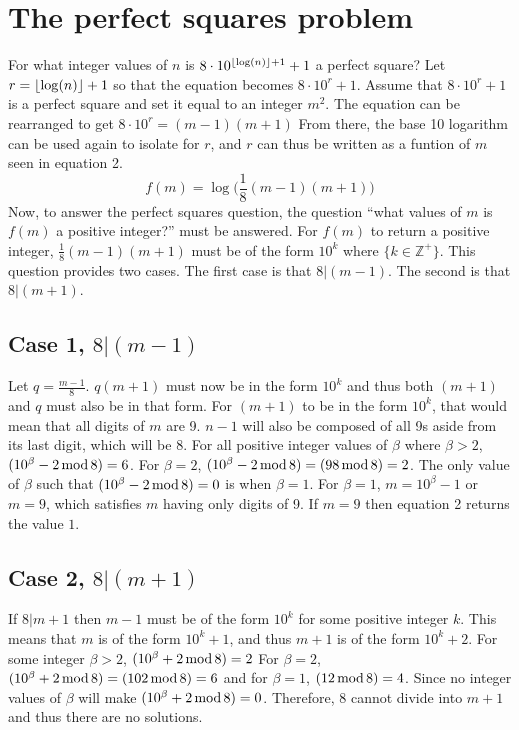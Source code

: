 \documentclass[a4paper, 12pt]{article}
\begin{document}
\section{The perfect squares problem}
For what integer values of $n$ is $8\cdot10^{\lfloor\log(n)\rfloor+1}+1$ a perfect square?
\newline
Let $r = \lfloor\log(n)\rfloor+1$ so that the equation becomes $8\cdot10^r+1$. Assume that $8\cdot10^r+1$ is a perfect square and set it equal to an integer $m^2$. The equation can be rearranged to get $8\cdot10^r = (m-1)(m+1)$ From there, the base 10 logarithm can be used again to isolate for $r$, and $r$ can thus be written as a funtion of $m$ seen in equation 2.
\begin{equation}
f(m) = \log\Bigg(\frac{1}{8}(m-1)(m+1)\Bigg)
\end{equation}
Now, to answer the perfect squares question, the question ``what values of $m$ is $f(m)$ a positive integer?'' must be answered. For $f(m)$ to return a positive integer, $\frac{1}{8}(m-1)(m+1)$ must be of the form $10^k$ where $\{k\in\mathbb{Z}^+\}$. This question provides two cases. The first case is that $8|(m-1)$. The second is that $8|(m+1)$.
\subsection{Case 1, $8|(m-1)$}
Let $q = \frac{m-1}{8}$. $q(m+1)$ must now be in the form $10^k$ and thus both $(m+1)$ and $q$ must also be in that form. For $(m+1)$ to be in the form $10^k$, that would mean that all digits of $m$ are 9. $n-1$ will also be composed of all 9s aside from its last digit, which will be 8. For all positive integer values of $\beta$ where $\beta > 2$, $({10^\beta-2}\operatorname{ mod } {8}) = 6$. For $\beta=2$, $({10^\beta-2}\operatorname{ mod } {8})=({98}\operatorname{ mod } {8})=2$. The only value of $\beta$ such that $({10^\beta-2}\operatorname{ mod } {8})=0$ is when $\beta=1$. For $\beta=1$, $m=10^\beta-1$ or $m=9$, which satisfies $m$ having only digits of 9. If $m=9$ then equation 2 returns the value $1$.
\subsection{Case 2, $8|(m+1)$}
If $8|m+1$ then $m-1$ must be of the form $10^k$ for some positive integer $k$. This means that $m$ is of the form $10^k+1$, and thus $m+1$ is of the form $10^k+2$. For some integer $\beta > 2$, $({10^\beta+2}\operatorname{ mod } {8}) = 2$ For $\beta=2$, $({10^\beta+2}\operatorname{ mod } {8})=({102}\operatorname{ mod } {8})=6$ and for $\beta=1$, $({12}\operatorname{ mod } {8})=4$. Since no integer values of $\beta$ will make $({10^\beta+2}\operatorname{ mod } {8})=0$. Therefore, $8$ cannot divide into $m+1$ and thus there are no solutions.
\end{document}
